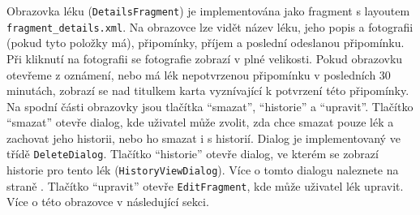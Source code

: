 \documentclass[../TakeYourPill.tex]{subfiles}
\begin{document}
Obrazovka léku (\texttt{DetailsFragment}) je implementována jako fragment s layoutem \texttt{fragment\_details.xml}. Na obrazovce lze vidět název léku, jeho popis a fotografii (pokud tyto položky má), připomínky, příjem a poslední odeslanou připomínku. Při kliknutí na fotografii se fotografie zobrazí v plné velikosti. Pokud obrazovku otevřeme z oznámení, nebo má lék nepotvrzenou připomínku v posledních 30 minutách, zobrazí se nad titulkem karta vyznívající k potvrzení této připomínky. Na spodní části obrazovky jsou tlačítka \enquote{smazat}, \enquote{historie} a \enquote{upravit}. Tlačítko \enquote{smazat} otevře dialog, kde uživatel může zvolit, zda chce smazat pouze lék a zachovat jeho historii, nebo ho smazat i s historií. Dialog je implementovaný ve třídě \texttt{DeleteDialog}. Tlačítko \enquote{historie} otevře dialog, ve kterém se zobrazí historie pro tento lék (\texttt{HistoryViewDialog}). Více o tomto dialogu naleznete na straně \pageref{sec:historydialog}. Tlačítko \enquote{upravit} otevře \texttt{EditFragment}, kde může uživatel lék upravit. Více o této obrazovce v následující sekci.
\end{document}
